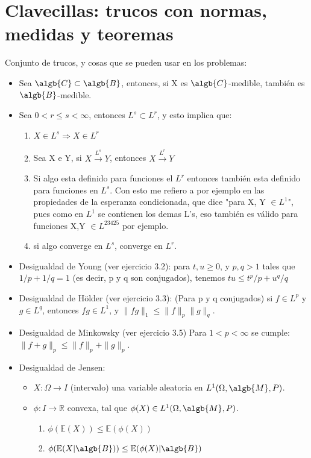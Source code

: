 \documentclass{apuntes}
\begin{document}
\section{Clavecillas: trucos con normas, medidas y teoremas}

Conjunto de trucos, y cosas que se pueden usar en los problemas:

\begin{itemize}
\item Sea $\algb{C} \subset \algb{B}$, entonces, si X es $\algb{C}$-medible, también es $\algb{B}$-medible.

\item Sea $0<r\leq s<\infty$, entonces $L^s \subset L^r$, y esto implica que:
\begin{enumerate}
\item  $X \in L^s \Rightarrow X \in L^r$
\item Sea X e Y, si $X \stackrel{L^s}{\rightarrow} Y$, entonces $X \stackrel{L^r}{\rightarrow} Y$
\item Si algo esta definido para funciones el $L^r$ entonces también esta definido para funciones en $L^s$. Con esto me refiero a por ejemplo en las propiedades de la esperanza condicionada, que dice "para X, Y $\in L^1$", pues como en $L^1$ se contienen los demas L's, eso también es válido para funciones X,Y $\in L^{23425}$ por ejemplo.
\item si algo converge en $L^s$, converge en $L^r$.
\end{enumerate}

\item Desigualdad de Young (ver ejercicio 3.2): para $t, u \ge 0$, y $p,q > 1$ tales que $1/p + 1/q =1$ (es decir, p y q son conjugados), tenemos $tu \le t^p/ p + u^q/ q$
\item Desigualdad de Hölder (ver ejercicio 3.3): (Para p y q conjugados) si $f\in L^p$ y $g\in L^q$, entonces $fg\in L^1$, y $\|fg\|_1 \le \|f\|_p\|g\|_q$.
\item Desigualdad de Minkowsky (ver ejercicio 3.5) Para $1<p<\infty$ se cumple:
 $\|f + g\|_p \le \|f\|_p + \|g\|_p$.
\item Desigualdad de Jensen:
\begin{itemize}
\item $X: \Omega \rightarrow I$ (intervalo) una variable aleatoria en $L^1(\Omega, \algb{M},P)$.
\item $\phi: I \rightarrow \mathbb{R}$ convexa, tal que $\phi(X) \in L^1(\Omega,\algb{M},P)$.
\begin{enumerate}
\item $\phi(\mathbb{E}(X)) \leq \mathbb{E}(\phi(X))$
\item $\phi(\mathbb{E}(X|\algb{B})) \leq \mathbb{E}(\phi(X)|\algb{B})$


\end{enumerate}
\end{itemize}
\end{itemize}
\end{document}
